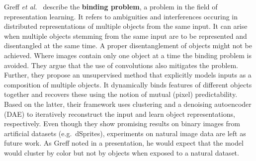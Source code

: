 \documentclass[a4paper,12pt]{report}
\begin{document}
\par Greff \textit{et al.\ }\cite{BindingRC} describe the \textbf{binding problem}, a problem in the field of representation learning. It refers to ambiguities and interferences occuring in distributed representations of multiple objects from the same input. It can arise when multiple objects stemming from the same input are to be represented and disentangled at the same time. A proper disentanglement of objects might not be achieved. Where images contain only one object at a time the binding problem is avoided. They argue that the use of convolutions also mitigates the problem. Further, they propose an unsupervised method that explicitly models inputs as a composition of multiple objects. It dynamically binds features of different objects together and recovers these using the notion of mutual (pixel) predictability. Based on the latter, their framework uses clustering and a denoising autoencoder (DAE) to iteratively reconstruct the input and learn object representations, respectively. Even though they show promising results on binary images from artificial datasets (e.g.\ dSprites), experiments on natural image data are left as future work. As Greff noted in a presentation, he would expect that the model would cluster by color but not by objects when exposed to a natural dataset. 


\end{document}
